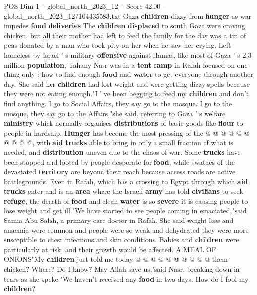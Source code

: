 \begin{textsample}{POS Dim 1 – global\_north\_2023\_12 – Score 42.00 – global\_north\_2023\_12/104435583.txt}  \label{ex:f1_pos_090}
Gaza \textbf{children} dizzy from \textbf{hunger} as war impedes \textbf{food} \textbf{deliveries} The \textbf{children} \textbf{displaced} to south Gaza were craving chicken, but all their mother had left to feed the family for the day was a tin of peas donated by a man who took pity on her when he saw her crying.
Left homeless by Israel ' s military \textbf{offensive} against Hamas, like most of Gaza ' s 2.3 million \textbf{population}, Tahany Nasr was in a \textbf{tent} \textbf{camp} in Rafah focused on one thing only : how to find enough \textbf{food} and \textbf{water} to get everyone through another day.
She said her \textbf{children} had lost weight and were getting dizzy spells because they were not eating enough."I ' ve been begging to feed my \textbf{children} and don't find anything.
I go to Social Affairs, they say go to the mosque.
I go to the mosque, they say go to the Affairs,"she said, referring to Gaza ' s welfare \textbf{ministry} which normally organises \textbf{distributions} of basic goods like \textbf{flour} to people in hardship. \textbf{Hunger} has become the most pressing of the @ @ @ @ @ @ @ @ @ @, with \textbf{aid} \textbf{trucks} able to bring in only a small fraction of what is needed, and \textbf{distribution} uneven due to the chaos of war.
Some \textbf{trucks} have been stopped and looted by people desperate for \textbf{food}, while swathes of the devastated \textbf{territory} are beyond their reach because access roads are active battlegrounds.
Even in Rafah, which has a crossing to Egypt through which \textbf{aid} \textbf{trucks} enter and is an \textbf{area} where the Israeli \textbf{army} has told \textbf{civilians} to seek \textbf{refuge}, the dearth of \textbf{food} and clean \textbf{water} is so \textbf{severe} it is causing people to lose weight and get ill."We have started to see people coming in emaciated,"said Samia Abu Salah, a primary care doctor in Rafah.
She said weight loss and anaemia were common and people were so weak and dehydrated they were more susceptible to chest infections and skin conditions.
Babies and \textbf{children} were particularly at risk, and their growth would be affected.
A MEAL OF ONIONS"My \textbf{children} just told me today @ @ @ @ @ @ @ @ @ @ them chicken?
Where?
Do I know?
May Allah save us,"said Nasr, breaking down in tears as she spoke."We haven't received any \textbf{food} in two days.
How do I fool my \textbf{children}?

\end{textsample}
